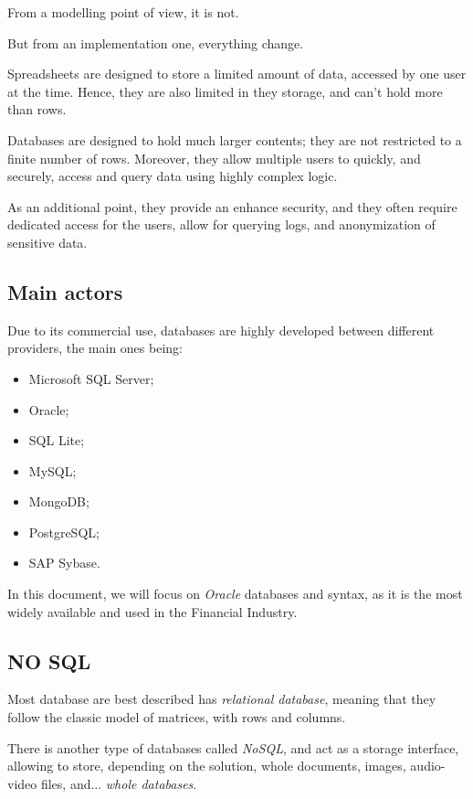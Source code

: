 \documentclass[12pt, letterpaper]{report}
\begin{document}
From a modelling point of view, it is not.

But from an implementation one, everything change.

Spreadsheets are designed to store a limited amount of data, accessed by one user at the time. Hence, they are also limited in they storage, and can't hold more than  rows.

Databases are designed to hold much larger contents; they are not restricted to a finite number of rows.
Moreover, they allow multiple users to quickly, and securely, access and query data using highly complex logic.

As an additional point, they provide an enhance security, and they often require dedicated access for the users, allow for querying logs, and anonymization of sensitive data.

\subsection{Main actors}

Due to its commercial use, databases are highly developed between different providers, the main ones being:
\begin{itemize}
	\item Microsoft SQL Server;
	\item Oracle;
	\item SQL Lite;
	\item MySQL;
	\item MongoDB;
	\item PostgreSQL;
	\item SAP Sybase.
\end{itemize}

In this document, we will focus on \textit{Oracle} databases and syntax, as it is the most widely available and used in the Financial Industry.

\subsection{NO SQL}

Most database are best described has \textit{relational database}, meaning that they follow the classic model of matrices, with rows and columns.

There is another type of databases called \textit{NoSQL}, and act as a storage interface, allowing to store, depending on the solution, whole documents, images, audio-video files, and... \textit{whole databases}.
\end{document}
